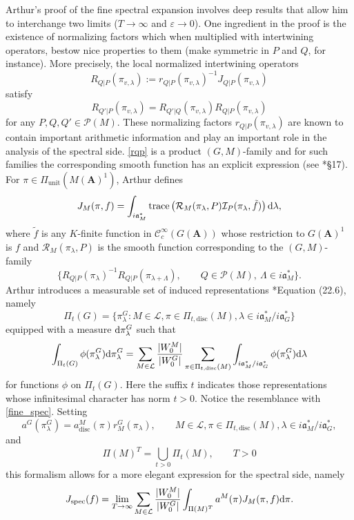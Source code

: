 \documentclass[11pt]{amsart}
\def\A{\mathbf A}
\def\CCC{\mathcal C}
\def\III{\mathcal I}
\def\LLL{\mathcal L}
\def\PPP{\mathcal P}
\def\aaa{\mathfrak a}
\def\d{\text d}
\def\mod#1{\lvert #1 \rvert} %
\def\RRR{\mathcal R}
\def\trace{\operatorname{trace}}
\theoremstyle{remark}
\begin{document}
Arthur's proof of the fine spectral expansion involves deep results that allow him to interchange two limits ($T \to \infty$ and $\varepsilon \to 0$). One ingredient in the proof is the existence of normalizing factors which when multiplied with intertwining operators, bestow nice properties to them (make symmetric in $P$ and $Q$, for instance). More precisely, the local normalized intertwining operators
\begin{equation} \label{rqp}
	R_{Q|P}(\pi_{v, \lambda}) := r_{Q|P}(\pi_{v, \lambda})^{-1} J_{Q|P}(\pi_{v, \lambda})
\end{equation}
satisfy
\[ R_{Q'|P}(\pi_{v, \lambda}) = R_{Q'|Q}(\pi_{v, \lambda}) R_{Q|P}(\pi_{v, \lambda}) \]
for any $P, Q, Q' \in \PPP(M)$. These normalizing factors $r_{Q|P}(\pi_{v, \lambda})$ are known to contain important arithmetic information and play an important role in the analysis of the spectral side. \cref{rqp} is a product $(G, M)$-family and for such families the corresponding smooth function has an explicit expression (see \cite{clay}*{\S 17}). For $\pi \in \Pi_{\text{unit}}(M(\A)^1)$, Arthur defines 
\begin{equation} \label{jmpi}
	J_M(\pi, f) = \int_{i\aaa_M^*} \trace \left( \RRR_M(\pi_\lambda, P) \III_P(\pi_\lambda, \tilde f) \right) \d \lambda,
\end{equation}
where $\tilde f$ is any $K$-finite function in $\CCC_c^\infty(G(\A))$ whose restriction to $G(\A)^1$ is $f$ and $\RRR_M(\pi_\lambda, P)$ is the smooth function corresponding to the $(G, M)$-family
\[ \{ R_{Q|P}(\pi_\lambda)^{-1} R_{Q|P}(\pi_{\lambda + \Lambda}), \qquad Q \in \PPP(M), \ \Lambda \in i\aaa_M^* \}. \]
Arthur introduces a measurable set of induced representations \cite{clay}*{Equation (22.6)}, namely
\[ \Pi_t(G) = \{ \pi_\lambda^G : M \in \LLL, \pi \in \Pi_{t, \text{disc}}(M), \lambda \in i\aaa_M^*/i\aaa_G^*  \} \]
equipped with a measure $\d \pi_\lambda^G$ such that 
\[ \int_{\Pi_t(G)} \phi(\pi_\lambda^G) \d \pi_\lambda^G = \sum_{M \in \LLL} \frac{\mod{W_0^M}}{\mod{W_0^G}} 
	\sum_{\pi \in \Pi_{t, \text{disc}}(M)} \int_{i\aaa_M^* / i\aaa_G^*} \phi(\pi_\lambda^G) \d \lambda \]
for functions $\phi$ on $\Pi_t(G)$. Here the suffix $t$ indicates those representations whose infinitesimal character has norm $t>0$. Notice the resemblance with \cref{fine_spec}. Setting
\[ a^G(\pi_\lambda^G) = a_{\text{disc}}^M(\pi) r_M^G(\pi_\lambda), \qquad M \in \LLL, \pi \in \Pi_{t, \text{disc}}(M), \lambda \in i\aaa_M^* / i\aaa_G^*, \]
and 
\[ \Pi(M)^T = \bigcup_{t > 0} \Pi_t(M), \qquad T > 0 \]
this formalism allows for a more elegant expression for the spectral side, namely
\[ J_{\text{spec}}(f) = \lim_{T \to \infty} \sum_{M \in \LLL} \frac{\mod{W_0^M}}{\mod{W_0^G}} \int_{\Pi(M)^T} a^M(\pi) J_M(\pi, f) \d \pi. \]
\end{document}
